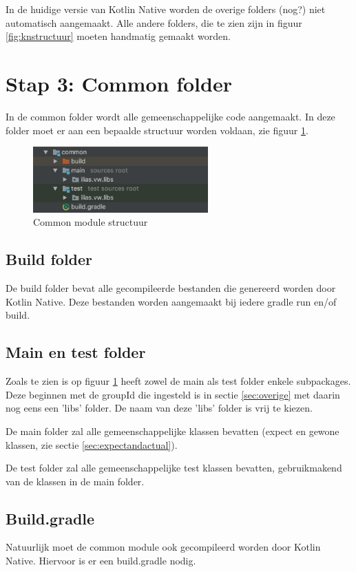 In de huidige versie van Kotlin Native worden de overige folders (nog?) niet automatisch aangemaakt. Alle andere folders, die te zien zijn in figuur \ref{fig:knstructuur} moeten handmatig gemaakt worden.

\section{Stap 3: Common folder }
In de common folder wordt alle gemeenschappelijke code aangemaakt. In deze folder moet er aan een bepaalde structuur worden voldaan, zie figuur \ref{fig:stap3-common}.

\begin{figure} [ht]
	\centering
	\includegraphics[width=0.60\textwidth]{img/stap3-common.png}
	\caption{Common module structuur}
	\label{fig:stap3-common}
\end{figure}

\subsection{Build folder}
De build folder bevat alle gecompileerde bestanden die genereerd worden door Kotlin Native. Deze bestanden worden aangemaakt bij iedere gradle run en/of build.

\subsection{Main en test folder}
Zoals te zien is op figuur \ref{fig:stap3-common} heeft zowel de main als test folder enkele subpackages. Deze beginnen met de groupId die ingesteld is in sectie \ref{sec:overige} met daarin nog eens een 'libs' folder. De naam van deze 'libs' folder is vrij te kiezen.

De main folder zal alle gemeenschappelijke klassen bevatten (expect en gewone klassen, zie sectie \ref{sec:expectandactual}).

De test folder zal alle gemeenschappelijke test klassen bevatten, gebruikmakend van de klassen in de main folder.

\subsection{Build.gradle}
Natuurlijk moet de common module ook gecompileerd worden door Kotlin Native. Hiervoor is er een build.gradle nodig.

